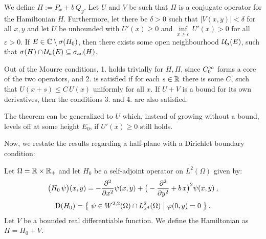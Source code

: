 \begin{thm}
    We define $\mathit\Pi := P_x + b \, Q_y$. Let $U$ and $V$ be such that $\mathit\Pi$ is a conjugate operator for the Hamiltonian $H$. Furthermore, let there be $\delta>0$ such that $|V(x,y)|<\delta$ for all $x,y$ and let $U$ be unbounded with $U'(x) \geq 0$ and $\underset{x\geq\varepsilon}{\inf} \, U'(x) > 0$ for all $\varepsilon>0$. If $E \in \mathbb{C} \setminus \sigma(H_0)$, then there exists some open neighbourhood $\mathcal{U}_a(E)$, such that $\sigma(H) \cap \mathcal{U}_a(E) \subseteq \sigma_{\mathrm{ac}}(H)$.
\end{thm}

\begin{lemma}
    Out of the Mourre conditions, 1. holds trivially for $H, \mathit\Pi$, since $C_0^\infty$ forms a core of the two operators, and 2. is satisfied if for each $s\in\mathbb{R}$ there is some $C$, such that $U(x+s) \leq C \, U(x)$ uniformly for all $x$. If $U+V$ is a bound for its own derivatives, then the conditions 3. and 4. are also satisfied.
\end{lemma}

\begin{lemma}
    The theorem can be generalized to $U$ which, instead of growing without a bound, levels off at some height $E_0$, if $U'(x)\geq 0$ still holds.
\end{lemma}

Now, we restate the results regarding a half-plane with a Dirichlet boundary condition:

\begin{defn}
    Let $\Omega=\mathbb{R}\times\mathbb{R}_+$ and let $H_0$ be a self-adjoint operator on $L^2(\Omega)$ given by:
    \begin{gather*}
        \big( H_0 \, \psi \big)(x, y)
        = -\frac{\partial ^2}{\partial x^2} \psi(x, y)
        + \big( -\frac{\partial ^2}{\partial y^2} + b \, x \big)^2 \psi(x, y)
        \: ,
        \\[3pt]
        \mathrm{D}(H_0)
        = \big\{
            \;
            \psi \in W^{2,2}(\Omega)
            \cap L^2_{x^4}(\Omega)
            \; \big| \;
            \varphi(0, y) = 0
            \;
        \big\}
        \: .
    \end{gather*}
    Let $V$ be a bounded real differentiable function. We define the Hamiltonian as $H = H_0 + V$.
\end{defn}
\begin{thm}

\end{thm}

